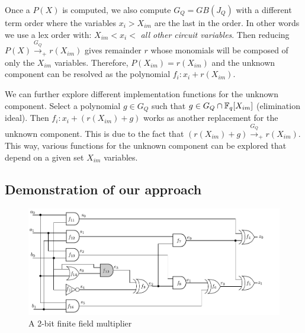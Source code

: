 Once a $P(X)$ is computed, we also compute $G_Q = GB(J_Q)$ with a
different term order where the variables $x_i > X_{im}$ are the last
in the order. In other words we use a lex order with: $X_{im} < x_i <
$ {\it all other circuit variables}. Then reducing
$P(X) \xrightarrow{G_Q}_+ r(X_{im})$ gives remainder $r$ whose
monomials will be composed of only the $X_{im}$ variables. Therefore,
$P(X_{im}) = r(X_{im})$ and the unknown component can be resolved as
the polynomial $f_i: x_i + r(X_{im})$.

We can further explore different implementation functions for the
unknown component. Select a polynomial $g \in G_Q$ such that $g \in
G_Q \cap {\mathbb{F}}_{q}[X_{im}]$ (elimination ideal). Then $f_i: x_i + (r(X_{im})
+ g)$ works as another replacement for the unknown component. This is
due to the fact that $(r(X_{im}) + g)
\xrightarrow{G_Q}_+r(X_{im})$. This way,  various functions for the
unknown component can be explored that depend on a given set $X_{im}$
variables. 
\vspace{-0.1in}
\subsection{Demonstration of our approach}

\begin{figure}[hbt]
	\begin{center}
	\includegraphics[scale = 0.65]{mas_c}
	\end{center}
	\vspace{-2ex}
	\caption{A 2-bit finite field multiplier}
	\label{mas_c}
	\vspace{-1ex}
\end{figure}

